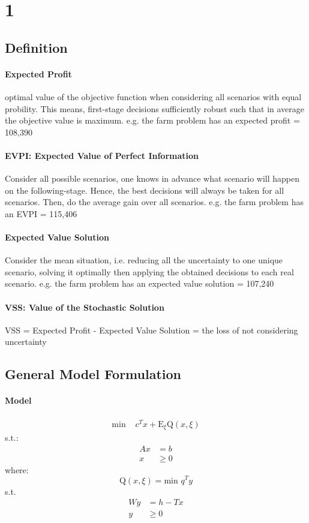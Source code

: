 \documentclass[12pt]{article}
\begin{document}
\section{1}
\subsection{Definition}

\paragraph{Expected Profit}
optimal value of the objective function when considering all scenarios with equal probility. This means, first-stage decisions sufficiently robust such that in average the objective value is maximum.
e.g. the farm problem has an expected profit = 108,390

\paragraph{EVPI: Expected Value of Perfect Information}
Consider all possible scenarios, one knows in advance what scenario will happen on the following-stage. Hence, the best decisions will always be taken for all scenarios.
Then, do the average gain over all scenarios.
e.g. the farm problem has an EVPI = 115,406

\paragraph{Expected Value Solution}
Consider the mean situation, i.e. reducing all the uncertainty to one unique scenario, solving it optimally then applying the obtained decisions to each real scenario.
e.g. the farm problem has an expected value solution = 107,240

\paragraph{VSS: Value of the Stochastic Solution}
VSS = Expected Profit - Expected Value Solution = the loss of not considering uncertainty

\subsection{General Model Formulation}

\paragraph{Model}
\begin{align}
	\text{min } & c^{T} x + \mathrm{E}_{\xi} \mathrm{Q}(x,\xi)
\end{align}
s.t.:
\begin{align}
Ax &= b\\
x &\geq 0
\end{align}
where:
\begin{equation}
\mathrm{Q}(x,\xi) = \text{min } q^T y
\end{equation}
s.t.
\begin{align}
W y &= h - Tx\\
y &\geq 0
\end{align}
\end{document}
